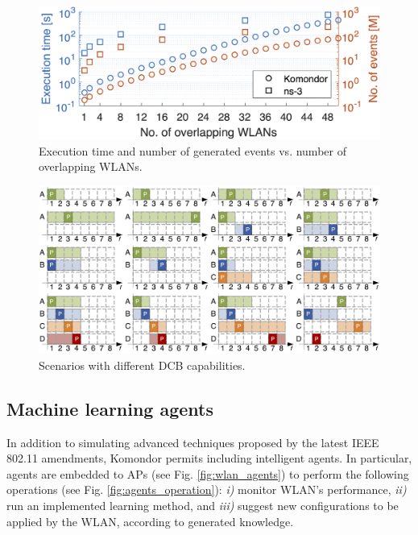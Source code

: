 \documentclass{article}
\begin{document}
	\begin{figure}[t]
		\centering	
		\includegraphics[width=1\columnwidth]{results_scenario_3_perf.png}
		\caption{Execution time and number of generated events vs. number of overlapping WLANs.}
		\label{fig:results_high_density_scenarios_time}
	\end{figure}
	
	\begin{figure}[h]
		\centering	
		\includegraphics[width=0.95\columnwidth]{channel_allocation.png}
		\caption{Scenarios with different DCB capabilities.} %
		\label{fig:channel_allocation}
	\end{figure}
	
	\subsection{Machine learning agents}
	\label{section:machine_learning}
	
	In addition to simulating advanced techniques proposed by the latest IEEE 802.11 amendments, Komondor permits including intelligent agents. In particular, agents are embedded to APs (see Fig. \ref{fig:wlan_agents}) to perform the following operations (see Fig. \ref{fig:agents_operation}): \emph{i)} monitor WLAN's performance, \emph{ii)} run an implemented learning method, and \emph{iii)} suggest new configurations to be applied by the WLAN, according to generated knowledge.
	
\end{document}
